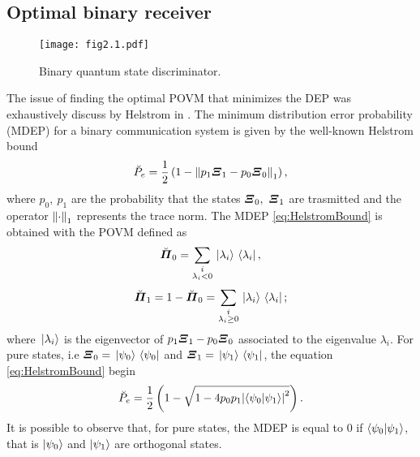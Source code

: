     \subsection{Optimal binary receiver}
    \begin{figure}[t]
        \begin{center}
            \texttt{[image: fig2.1.pdf]}
            \caption{Binary quantum state discriminator.}
            \label{fig:2.2}
        \end{center}
    \end{figure}
    The issue of finding the optimal POVM that minimizes the DEP was exhaustively discuss  by Helstrom in 
    \cite{helstrom3,holevo}. The minimum distribution error probability (MDEP) for a binary 
    communication system is given by the well-known Helstrom bound
    \begin{equation}
        \breve{P}_e = \frac{1}{2} \left(1-\norm{p_1 \bm{\relax{\varXi}}_1 - p_0 \bm{\relax{\varXi}}_0}_1 \right),
        \label{eq:HelstromBound}
    \end{equation}
    where $p_0,\ p_1$ are the probability that the states $\bm{\relax{\varXi}}_0,\ \bm{\relax{\varXi}}_1$ are trasmitted
    and the operator $\norm{\cdot}_1$ represents the trace norm. 
    The MDEP \ref{eq:HelstromBound} is obtained with the POVM defined as
    \begin{equation}
        \breve{\bm{\relax{\varPi}}}_0 = \sum_{\substack{i \\ \lambda_i<0}} \ket*{\lambda_i}\bra*{\lambda_i},
    \end{equation}
    \begin{equation*}
        \breve{\bm{\relax{\varPi}}}_1 = 1-\breve{\bm{\relax{\varPi}}}_0 = 
        \sum_{\substack{i \\ \lambda_i \geq 0}} \ket*{\lambda_i}\bra*{\lambda_i};
    \end{equation*}
    where $\ket*{\lambda_i}$ is the eigenvector of $p_1 \bm{\relax{\varXi}}_1 - p_0 \bm{\relax{\varXi}}_0$ associated to 
    the eigenvalue $\lambda_i$.
    For pure states, i.e $\bm{\relax{\varXi}}_0 = \ket*{\psi_0}\bra*{\psi_0}$ and $\bm{\relax{\varXi}}_1 = \ket*{\psi_1}
    \bra*{\psi_1}$, the equation \ref{eq:HelstromBound} begin
    \begin{equation}
        \breve{P}_e = \frac{1}{2} \left(1- \sqrt{1-4 p_0 p_1 \absolutevalue{\braket{\psi_0}{\psi_1}}^2}
        \right).
        \label{eq:HelstromBPure}
    \end{equation}
    It is possible to observe that, for pure states, the MDEP is equal to $0$ if $\braket{\psi_0}{\psi_1}$,
    that is $\ket{\psi_0}$ and $\ket{\psi_1}$ are orthogonal states.
